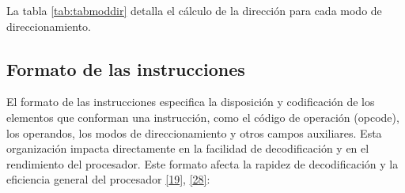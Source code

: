 \documentclass[12pt,oneside]{templates/unerthesis}
\begin{document}
La tabla \ref{tab:tabmoddir} detalla el cálculo de la dirección para cada modo de direccionamiento.

\begin{table}[!h]
\centering
\caption{\label{tab:tabmoddir}Modos de direccionamiento básicos}
\centering
{}
\end{table}

\hypertarget{formato-de-las-instrucciones}{%
\subsection{Formato de las instrucciones}\label{formato-de-las-instrucciones}}

El formato de las instrucciones especifica la disposición y codificación de los elementos que conforman una instrucción, como el código de operación (opcode), los operandos, los modos de direccionamiento y otros campos auxiliares. Esta organización impacta directamente en la facilidad de decodificación y en el rendimiento del procesador. Este formato afecta la rapidez de decodificación y la eficiencia general del procesador \protect\hyperlink{ref-hennessy2017computer}{{[}19{]}}, \protect\hyperlink{ref-tanenbaum_structured_2016}{{[}28{]}}:
\end{document}
